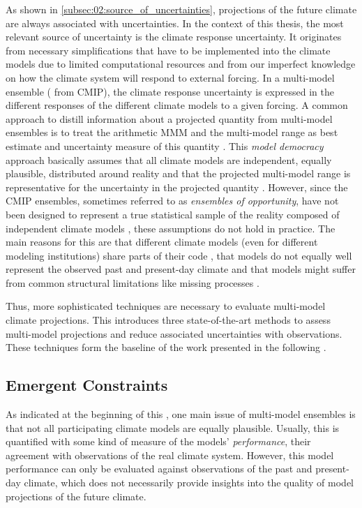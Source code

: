 As shown in \cref{subsec:02:source_of_uncertainties}, projections of the future
climate are always associated with uncertainties. In the context of this
thesis, the most relevant source of uncertainty is the climate response
uncertainty. It originates from necessary simplifications that have to be
implemented into the climate models due to limited computational resources and
from our imperfect knowledge on how the climate system will respond to external
forcing. In a multi-model ensemble (\eg{} from \ac{CMIP}), the climate response
uncertainty is expressed in the different responses of the different climate
models to a given forcing. A common approach to distill information about a
projected quantity from multi-model ensembles is to treat the arithmetic
\ac{MMM} and the multi-model range as best estimate and uncertainty measure of
this quantity \autocite{Collins2013}. This \emph{model democracy} approach
basically assumes that all climate models are independent, equally plausible,
distributed around reality and that the projected multi-model range is
representative for the uncertainty in the projected quantity
\autocite{Knutti2017a}. However, since the \ac{CMIP} ensembles, sometimes
referred to as \emph{ensembles of opportunity}, have not been designed to
represent a true statistical sample of the reality composed of independent
climate models \autocite{Tebaldi2007}, these assumptions do not hold in
practice. The main reasons for this are that different climate models (even for
different modeling institutions) share parts of their code
\autocite{Abramowitz2019, Knutti2013}, that models do not equally well
represent the observed past and present-day climate \autocite{Gleckler2008,
  Knutti2013} and that models might suffer from common structural limitations
like missing processes \autocite{Knutti2017a}.

Thus, more sophisticated techniques are necessary to evaluate multi-model
climate projections. This  introduces
three state-of-the-art methods to assess multi-model projections and reduce
associated uncertainties with observations. These techniques form the baseline
of the work presented in the following .


\subsection{Emergent Constraints}
\label{subsec:02:emergent_constraints}

As indicated at the beginning of this ,
one main issue of multi-model ensembles is that not all participating climate
models are equally plausible. Usually, this is quantified with some kind of
measure of the models' \emph{performance}, \ie{} their agreement with
observations of the real climate system. However, this model performance can
only be evaluated against observations of the past and present-day climate,
which does not necessarily provide insights into the quality of model
projections of the future climate.

